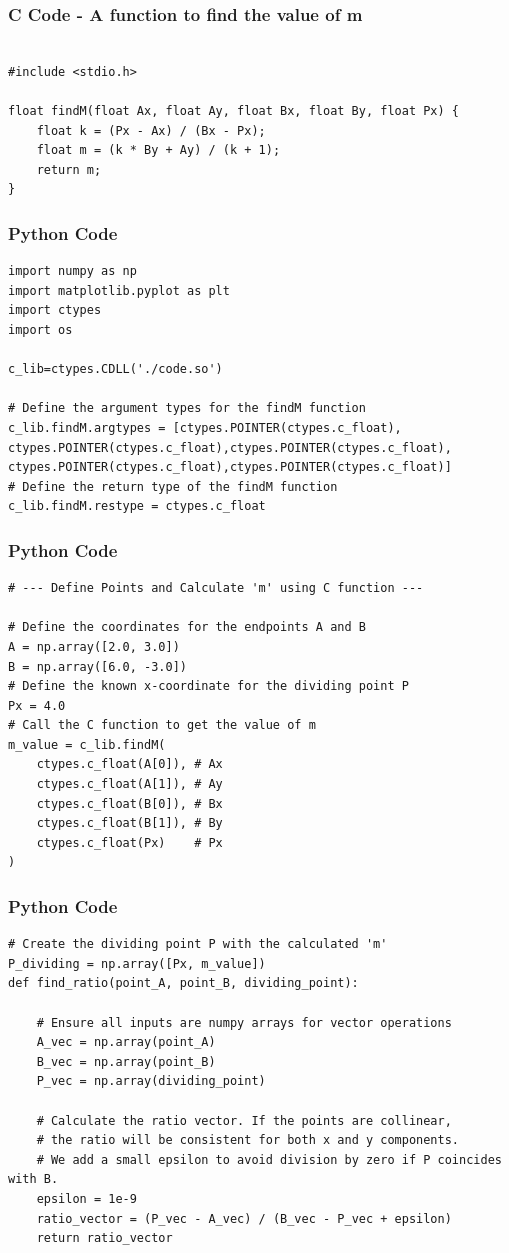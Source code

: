 \documentclass{beamer}
\begin{document}
\begin{frame}[fragile]
    \frametitle{C Code - A function to find the value of m}

    \begin{lstlisting}

#include <stdio.h>

float findM(float Ax, float Ay, float Bx, float By, float Px) {
    float k = (Px - Ax) / (Bx - Px);
    float m = (k * By + Ay) / (k + 1);
    return m;
}

    \end{lstlisting}
\end{frame}

\begin{frame}[fragile]
    \frametitle{Python Code}
    \begin{lstlisting}
import numpy as np
import matplotlib.pyplot as plt
import ctypes
import os

c_lib=ctypes.CDLL('./code.so')

# Define the argument types for the findM function
c_lib.findM.argtypes = [ctypes.POINTER(ctypes.c_float), ctypes.POINTER(ctypes.c_float),ctypes.POINTER(ctypes.c_float), ctypes.POINTER(ctypes.c_float),ctypes.POINTER(ctypes.c_float)]
# Define the return type of the findM function
c_lib.findM.restype = ctypes.c_float

    \end{lstlisting}
\end{frame}

\begin{frame}[fragile]
    \frametitle{Python Code}
    \begin{lstlisting}
# --- Define Points and Calculate 'm' using C function ---

# Define the coordinates for the endpoints A and B
A = np.array([2.0, 3.0])
B = np.array([6.0, -3.0])
# Define the known x-coordinate for the dividing point P
Px = 4.0
# Call the C function to get the value of m
m_value = c_lib.findM(
    ctypes.c_float(A[0]), # Ax
    ctypes.c_float(A[1]), # Ay
    ctypes.c_float(B[0]), # Bx
    ctypes.c_float(B[1]), # By
    ctypes.c_float(Px)    # Px
)
    \end{lstlisting}
\end{frame}

\begin{frame}[fragile]
    \frametitle{Python Code}
    \begin{lstlisting}
# Create the dividing point P with the calculated 'm'
P_dividing = np.array([Px, m_value])
def find_ratio(point_A, point_B, dividing_point):
    
    # Ensure all inputs are numpy arrays for vector operations
    A_vec = np.array(point_A)
    B_vec = np.array(point_B)
    P_vec = np.array(dividing_point)
    
    # Calculate the ratio vector. If the points are collinear,
    # the ratio will be consistent for both x and y components.
    # We add a small epsilon to avoid division by zero if P coincides with B.
    epsilon = 1e-9
    ratio_vector = (P_vec - A_vec) / (B_vec - P_vec + epsilon)
    return ratio_vector
    \end{lstlisting}
\end{frame}
\end{document}
